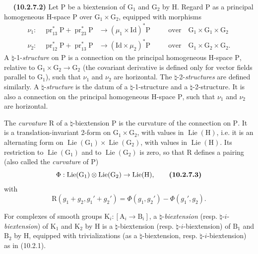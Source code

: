 \documentclass[11pt,leqno]{article}
\newcommand{\Page}[1]{\ifvmode\noindent\else\unskip\ \fi{\footnotesize\textcolor{gray}{[p.\,#1]}}\ \ignorespaces}
\begin{document}
\Page{65}
\textbf{(10.2.7.2)} Let \(\mathrm{P}\) be a biextension of
\(\mathrm{G}_1\) and \(\mathrm{G}_2\) by \(\mathrm{H}\).
Regard \(\mathrm{P}\) as a principal homogeneous \(\mathrm{H}\)-space
\(\mathrm{P}\) over \(\mathrm{G}_1\times\mathrm{G}_2\), equipped with
morphisms
\[
\begin{aligned}
\nu_1:\quad
\operatorname{pr}_{13}^{*}\mathrm{P}
+\operatorname{pr}_{23}^{*}\mathrm{P}
&\to(\mu_1\times\mathrm{Id})^{*}\mathrm{P}
&&\quad\text{over}\quad
\mathrm{G}_1\times\mathrm{G}_1\times\mathrm{G}_2\\
\nu_2:\quad
\operatorname{pr}_{12}^{*}\mathrm{P}
+\operatorname{pr}_{13}^{*}\mathrm{P}
&\to(\mathrm{Id}\times\mu_2)^{*}\mathrm{P}
&&\quad\text{over}\quad
\mathrm{G}_1\times\mathrm{G}_2\times\mathrm{G}_2.
\end{aligned}
\]
A \(\natural\)-1-\textit{structure} on \(\mathrm{P}\) is a
connection on the principal homogeneous \(\mathrm{H}\)-space \(\mathrm{P}\), relative to
\(\mathrm{G}_1\times\mathrm{G}_2\to\mathrm{G}_2\) (the covariant
derivative is defined only for vector fields parallel
to \(\mathrm{G}_1\)), such that \(\nu_1\) and \(\nu_2\) are
horizontal. The
\(\natural\)-2-\textit{structures} are defined similarly. A
\(\natural\)-\textit{structure} is the datum of a
\(\natural\)-1-structure and a \(\natural\)-2-structure.
It is also a connection on the principal homogeneous \(\mathrm{H}\)-space
\(\mathrm{P}\), such that \(\nu_1\) and \(\nu_2\) are horizontal.

The \textit{curvature} \(\mathrm{R}\) of a \(\natural\)-biextension
\(\mathrm{P}\) is the curvature of the connection on \(\mathrm{P}\).
It is a translation-invariant 2-form on
\(\mathrm{G}_1\times\mathrm{G}_2\), with values in
\(\operatorname{Lie}(\mathrm{H})\), i.e. it is an alternating form
on
\(\operatorname{Lie}(\mathrm{G}_1)\times
\operatorname{Lie}(\mathrm{G}_2)\), with values in
\(\operatorname{Lie}(\mathrm{H})\).
Its restriction to \(\operatorname{Lie}(\mathrm{G}_1)\) and to
\(\operatorname{Lie}(\mathrm{G}_2)\) is zero, so that
\(\mathrm{R}\) defines a pairing (also called the
\textit{curvature} of \(\mathrm{P}\))
\[
\Phi:\operatorname{Lie}(\mathrm{G}_1)\otimes
\operatorname{Lie}(\mathrm{G}_2)\to\operatorname{Lie}(\mathrm{H}),
\tag*{\textbf{(10.2.7.3)}}
\]
with
\[
\mathrm{R}(g_1+g_2,g_1'+g_2')
=\Phi(g_1,g_2')-\Phi(g_1',g_2).
\]

For complexes of smooth groups
\(\mathrm{K}_i:[\mathrm{A}_i\to\mathrm{B}_i]\), a
\(\natural\)-\textit{biextension}
(resp. \(\natural\)-\(i\)-\textit{biextension}) of
\(\mathrm{K}_1\) and \(\mathrm{K}_2\) by \(\mathrm{H}\) is a
\(\natural\)-biextension (resp. \(\natural\)-\(i\)-biextension)
of \(\mathrm{B}_1\) and \(\mathrm{B}_2\) by \(\mathrm{H}\),
equipped with trivializations (as a \(\natural\)-biextension,
resp. \(\natural\)-\(i\)-biextension) as in (10.2.1).
\end{document}
